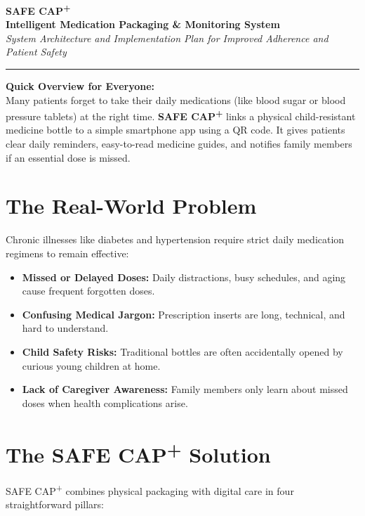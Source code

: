 \documentclass[11pt,a4paper]{article}
\begin{document}
\begin{center}
    {\Huge \textbf{\textcolor{primary}{SAFE CAP\textsuperscript{+}}}}\\[6pt]
    {\Large \textbf{\textcolor{secondary}{Intelligent Medication Packaging \& Monitoring System}}}\\[4pt]
    {\normalsize \textcolor{secondary}{\textit{System Architecture and Implementation Plan for Improved Adherence and Patient Safety}}}\\[8pt]
    \rule{\textwidth}{1.5pt}
\end{center}

\vspace{0.2cm}

\begin{tcolorbox}[colback=primary!5,colframe=primary]
    \textbf{\textcolor{primary}{Quick Overview for Everyone:}} \\
    Many patients forget to take their daily medications (like blood sugar or blood pressure tablets) at the right time. \textbf{SAFE CAP\textsuperscript{+}} links a physical child-resistant medicine bottle to a simple smartphone app using a QR code. It gives patients clear daily reminders, easy-to-read medicine guides, and notifies family members if an essential dose is missed.
\end{tcolorbox}

\section{The Real-World Problem}
Chronic illnesses like diabetes and hypertension require strict daily medication regimens to remain effective:
\begin{itemize}[leftmargin=*,itemsep=2pt]
    \item \textbf{Missed or Delayed Doses:} Daily distractions, busy schedules, and aging cause frequent forgotten doses.
    \item \textbf{Confusing Medical Jargon:} Prescription inserts are long, technical, and hard to understand.
    \item \textbf{Child Safety Risks:} Traditional bottles are often accidentally opened by curious young children at home.
    \item \textbf{Lack of Caregiver Awareness:} Family members only learn about missed doses when health complications arise.
\end{itemize}

\section{The SAFE CAP\textsuperscript{+} Solution}
SAFE CAP\textsuperscript{+} combines physical packaging with digital care in four straightforward pillars:
\end{document}
